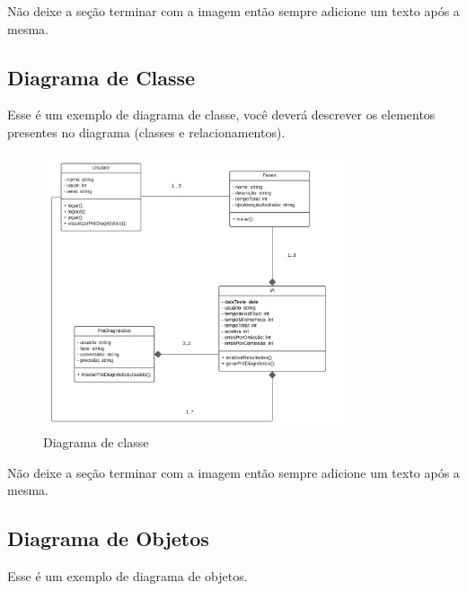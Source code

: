 \documentclass[
  a4paper,%
  12pt,%
  english,%
  brazilian,%
]{article}
\begin{document}
    Não deixe a seção terminar com a imagem então sempre adicione um texto após a mesma.
    
    \subsection*{Diagrama de Classe}

    Esse é um exemplo de diagrama de classe, você deverá descrever os elementos presentes no diagrama (classes e relacionamentos).

    \begin{figure}[h]
\centering
\caption{Diagrama de classe}%
\label{fig:diagrama-de-classe}
\includegraphics[width=0.8\textwidth]{Logos/diagrama-de-classe.png}
\end{figure}

     Não deixe a seção terminar com a imagem então sempre adicione um texto após a mesma.

    \subsection*{Diagrama de Objetos}

Esse é um exemplo de diagrama de objetos.
\end{document}
